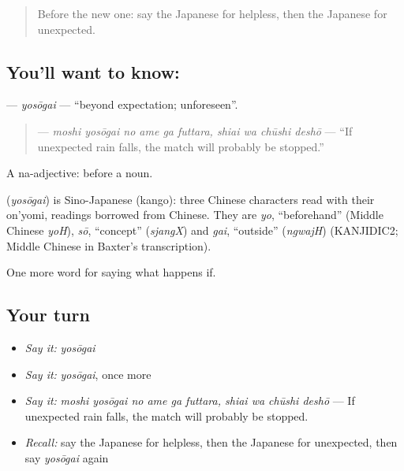 \label{lesson:JA-C520-yosougai}



\begin{quote}
Before the new one: say the Japanese for helpless, then the Japanese for unexpected.
\end{quote}

\subsection*{You'll want to know: }
\textbf{} — \emph{yosōgai} — \textquotedblleft{}beyond expectation; unforeseen\textquotedblright{}.

\begin{quote}
\textbf{    } — \emph{moshi yosōgai no ame ga futtara, shiai wa chūshi deshō} — \textquotedblleft{}If unexpected rain falls, the match will probably be stopped.\textquotedblright{}
\end{quote}

A na-adjective:  before a noun.

\begin{cousinweb}
\textbf{} (\emph{yosōgai}) is Sino-Japanese (kango): three Chinese characters read with their on'yomi, readings borrowed from Chinese. They are \emph{yo}, \textquotedblleft{}beforehand\textquotedblright{} (Middle Chinese \emph{yoH}), \emph{sō}, \textquotedblleft{}concept\textquotedblright{} (\emph{sjangX}) and \emph{gai}, \textquotedblleft{}outside\textquotedblright{} (\emph{ngwajH}) (KANJIDIC2; Middle Chinese in Baxter's transcription).
\end{cousinweb}

\begin{grammarlens}[title={What you've built}]
One more word for saying what happens if.
\end{grammarlens}

\subsection*{Your turn}
\begin{itemize}
\raggedright
  \item \emph{Say it:} \emph{yosōgai}
  \item \emph{Say it:} \emph{yosōgai}, once more
  \item \emph{Say it:} \emph{moshi yosōgai no ame ga futtara, shiai wa chūshi deshō} — If unexpected rain falls, the match will probably be stopped.
  \item \emph{Recall:} say the Japanese for helpless, then the Japanese for unexpected, then say \emph{yosōgai} again
\end{itemize}

